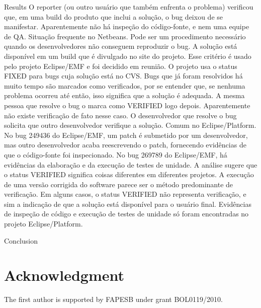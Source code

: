 \begin{section}{Results}
	O reporter (ou outro usuário que também enfrenta o problema) verificou que, em uma build do produto que inclui a solução, o bug deixou de se manifestar. Aparentemente não há inspeção do código-fonte, e nem uma equipe de QA. Situação frequente no Netbeans. Pode ser um procedimento necessário quando os desenvolvedores não conseguem reproduzir o bug.
	A solução está disponível em um build que é divulgado no site do projeto. Esse critério é usado pelo projeto Eclipse/EMF e foi decidido em reunião. O projeto usa o status FIXED para bugs cuja solução está no CVS.
	Bugs que já foram resolvidos há muito tempo são marcados como verificados, por se entender que, se nenhuma problema ocorreu até então, isso significa que a solução é adequada.
	A mesma pessoa que resolve o bug o marca como VERIFIED logo depois. Aparentemente não existe verificação de fato nesse caso.
	O desenvolvedor que resolve o bug solicita que outro desenvolvedor verifique a solução. Comum no Eclipse/Platform.
	No bug 249436 do Eclipse/EMF, um patch é submetido por um desenvolvedor, mas outro desenvolvedor acaba reescrevendo o patch, fornecendo evidências de que o código-fonte foi inspecionado.
	No bug 269789 do Eclipse/EMF, há evidências da elaboração e da execução de testes de unidade.
	A análise sugere que o status VERIFIED significa coisas diferentes em diferentes projetos. A execução de uma versão corrigida do software parece ser o método predominante de verificação. Em alguns casos, o status VERIFIED não representa verificação, e sim a indicação de que a solução está disponível para o usuário final. Evidências de inspeção de código e execução de testes de unidade só foram encontradas no projeto Eclipse/Platform.	

\end{section}

\begin{section}{Conclusion}
\end{section}

\section*{Acknowledgment}

The first author is supported by FAPESB under grant BOL0119/2010.
